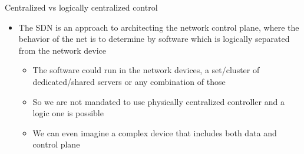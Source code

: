 \documentclass{article}
\begin{document}
Centralized vs logically centralized control
  \begin{itemize}
    \item The SDN is an approach to architecting the network control plane, where the behavior of the net is to determine by software which is logically separated from the network device
      \begin{itemize}
        \item The software could run in the network devices, a set/cluster of dedicated/shared servers or any combination of those
        \item So we are not mandated to use physically centralized controller and a logic one is possible
        \item We can even imagine a complex device that includes both data and control plane
      \end{itemize}
  \end{itemize}
\end{document}
